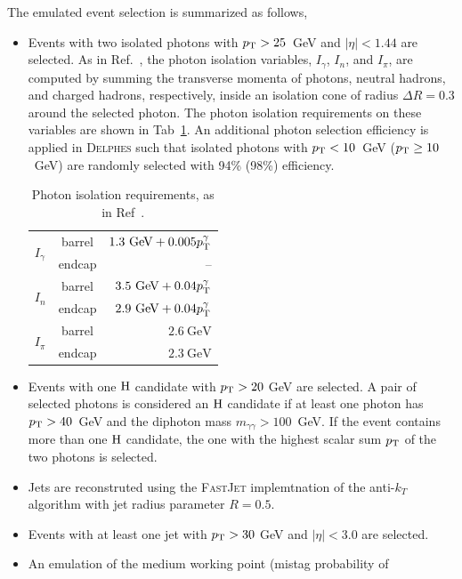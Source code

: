The emulated event selection is summarized as follows,
\begin{itemize}
\item Events with two isolated photons with $p_{\mathrm{T}}>25$~GeV and
  $|\eta|<1.44$ are selected. As in Ref.~\cite{CMSPhoton}, the photon
  isolation variables, $I_{\gamma}$, $I_{n}$, and $I_{\pi}$, are
  computed by summing the transverse momenta of photons, neutral
  hadrons, and charged hadrons, respectively, inside an isolation
  cone of radius $\Delta R=0.3$ around the selected photon. The photon
  isolation requirements on these variables
  are shown in Tab~\ref{tab:isolation}. An additional photon selection
  efficiency is applied in \textsc{Delphes} such that isolated photons with $p_{\mathrm{T}}<10$~GeV ($p_{\mathrm{T}}\geq10$~GeV) are
  randomly selected with 94\% (98\%) efficiency.
\begin{table}\centering
\caption{\label{tab:isolation}Photon isolation requirements, as in Ref~\cite{CMSPhoton}.}
\begin{tabular}{lc|r}
 \multirow{2}{*}{$I_{\gamma}$} & barrel & $1.3~\textrm{GeV} + 0.005p_{\mathrm{T}}^{\gamma}$\\
 & endcap & -- \\\hline
 \multirow{2}{*}{$I_{n}$} & barrel & $3.5~\textrm{GeV} + 0.04p_{\mathrm{T}}^{\gamma}$\\
 & endcap &  $2.9~\textrm{GeV} + 0.04p_{\mathrm{T}}^{\gamma}$ \\\hline
 \multirow{2}{*}{$I_{\pi}$} & barrel & $2.6~\textrm{GeV}$\\
 & endcap &  $2.3~\textrm{GeV}$ \\
\end{tabular}
\end{table}
\item Events with one $\mathrm{H}$ candidate with $p_{\mathrm{T}}>20$ GeV are selected. A pair of selected
  photons is considered an $\mathrm{H}$ candidate if at
  least one photon has $p_{\mathrm{T}}>40$~GeV and the diphoton mass
  $m_{\gamma\gamma}>100$~GeV. If the event contains more than one $\mathrm{H}$ candidate,
  the one with the highest scalar sum $p_{\mathrm{T}}$ of the two photons is selected. 
\item Jets are reconstruted using the \textsc{FastJet}\cite{fastjet} implemtnation
  of the anti-$k_T$\cite{antikt} algorithm with jet radius parameter $R=0.5$.
\item Events with at least one jet with $p_{\mathrm{T}}>30$ GeV and $|\eta|<3.0$
  are selected.
\item An emulation of the medium working point (mistag probability of

\end{itemize}
